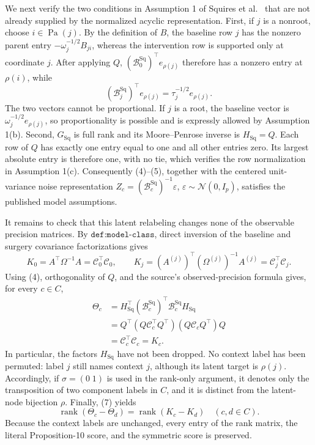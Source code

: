 We next verify the two conditions in Assumption 1 of Squires
et al.~\cite[Assumption 1]{pmlr-v202-squires23a} that
are not already supplied by the normalized acyclic representation.  First,
if \(j\) is a nonroot, choose \(i\in\operatorname{Pa}(j)\).  By the
definition of \(B\), the baseline row \(j\) has the nonzero parent entry
\(-\omega_j^{-1/2}B_{ji}\), whereas the intervention row is supported
only at coordinate \(j\).  After applying \(Q\),
\((\mathcal B_0^{\mathrm{Sq}})^{\top}e_{\rho(j)}\) therefore has a
nonzero entry at \(\rho(i)\), while
\[
 (\mathcal B_j^{\mathrm{Sq}})^{\top}e_{\rho(j)}
 =\tau_j^{-1/2}e_{\rho(j)}.
\]
The two vectors cannot be proportional.  If \(j\) is a root, the
baseline vector is \(\omega_j^{-1/2}e_{\rho(j)}\), so proportionality is
possible and is expressly allowed by Assumption 1(b).  Second,
\(G_{\mathrm{Sq}}\) is full rank and its Moore--Penrose inverse is
\(H_{\mathrm{Sq}}=Q\).  Each row of \(Q\) has exactly one entry equal to
one and all other entries zero.  Its largest absolute entry is therefore
one, with no tie, which verifies the row normalization in Assumption
1(c).  Consequently (4)--(5), together with the centered unit-variance
noise representation
\(Z_c=(\mathcal B_c^{\mathrm{Sq}})^{-1}\varepsilon\),
\(\varepsilon\sim\mathcal N(0,I_p)\), satisfies the published model
assumptions.

It remains to check that this latent relabeling changes none of the
observable precision matrices.  By \(\texttt{def:model-class}\), direct
inversion of the baseline and surgery covariance factorizations gives
\[
 K_0=A^{\top}\Omega^{-1}A=\mathcal C_0^{\top}\mathcal C_0,
 \qquad
 K_j=(A^{(j)})^{\top}(\Omega^{(j)})^{-1}A^{(j)}
     =\mathcal C_j^{\top}\mathcal C_j.                            \tag{6}
\]
Using (4), orthogonality of \(Q\), and the source's observed-precision
formula gives, for every \(c\in C\),
\[
 \begin{aligned}
 \Theta_c
 &=H_{\mathrm{Sq}}^{\top}
   (\mathcal B_c^{\mathrm{Sq}})^{\top}
   \mathcal B_c^{\mathrm{Sq}}H_{\mathrm{Sq}}\\
 &=Q^{\top}(Q\mathcal C_c^{\top}Q^{\top})
            (Q\mathcal C_cQ^{\top})Q\\
 &=\mathcal C_c^{\top}\mathcal C_c
 =K_c.                                                            \tag{7}
 \end{aligned}
\]
In particular, the factors \(H_{\mathrm{Sq}}\) have not been dropped.
No context label has been permuted: label \(j\) still names context
\(j\), although its latent target is \(\rho(j)\).  Accordingly, if
\(\sigma=(0\;1)\) is used in the rank-only argument, it denotes only the
transposition of two component labels in \(C\), and it is distinct from
the latent-node bijection \(\rho\).  Finally, (7) yields
\[
 \operatorname{rank}(\Theta_c-\Theta_d)
 =\operatorname{rank}(K_c-K_d)
 \quad(c,d\in C).
\]
Because the context labels are unchanged, every entry of the rank matrix,
the literal Proposition-10 score, and the symmetric score is preserved.


